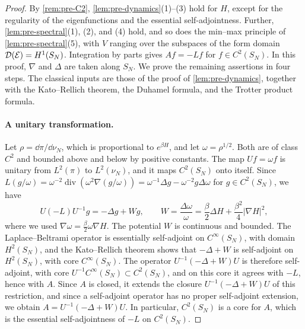 \begin{proof}
By \cref{rem:pre-C2}, \cref{lem:pre-dynamics}(1)--(3) hold for $H$, except for the regularity of the eigenfunctions and the essential self-adjointness. Further, \cref{lem:pre-spectral}(1), (2), and (4) hold, and so does the min--max principle of \cref{lem:pre-spectral}(5), with $V$ ranging over the subspaces of the form domain $\mathcal D(\mathcal E)=H^1(S_N)$. Integration by parts gives $Af=-Lf$ for $f\in C^2(S_N)$. In this proof, $\nabla$ and $\Delta$ are taken along $S_N$. We prove the remaining assertions in four steps. The classical inputs are those of the proof of \cref{lem:pre-dynamics}, together with the Kato--Rellich theorem, the Duhamel formula, and the Trotter product formula.

\paragraph{A unitary transformation.} Let $\rho=\dd\pi/\dd\nu_N$, which is proportional to $e^{\beta H}$, and let $\omega=\rho^{1/2}$. Both are of class $C^2$ and bounded above and below by positive constants. The map $Uf=\omega f$ is unitary from $L^2(\pi)$ to $L^2(\nu_N)$, and it maps $C^2(S_N)$ onto itself. Since $L(g/\omega)=\omega^{-2}\operatorname{div}(\omega^2\nabla(g/\omega))=\omega^{-1}\Delta g-\omega^{-2}g\Delta\omega$ for $g\in C^2(S_N)$, we have
\begin{equation*}
U(-L)U^{-1}g=-\Delta g+Wg,\qquad W=\frac{\Delta\omega}\omega=\frac\beta2\Delta H+\frac{\beta^2}4|\nabla H|^2,
\end{equation*}
where we used $\nabla\omega=\frac\beta2\omega\nabla H$. The potential $W$ is continuous and bounded. The Laplace--Beltrami operator is essentially self-adjoint on $C^\infty(S_N)$, with domain $H^2(S_N)$, and the Kato--Rellich theorem shows that $-\Delta+W$ is self-adjoint on $H^2(S_N)$, with core $C^\infty(S_N)$. The operator $U^{-1}(-\Delta+W)U$ is therefore self-adjoint, with core $U^{-1}C^\infty(S_N)\subset C^2(S_N)$, and on this core it agrees with $-L$, hence with $A$. Since $A$ is closed, it extends the closure $U^{-1}(-\Delta+W)U$ of this restriction, and since a self-adjoint operator has no proper self-adjoint extension, we obtain $A=U^{-1}(-\Delta+W)U$. In particular, $C^2(S_N)$ is a core for $A$, which is the essential self-adjointness of $-L$ on $C^2(S_N)$.


\end{proof}
